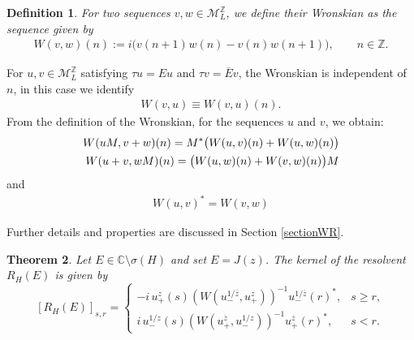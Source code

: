 \documentclass[12pt,oneside,onecolumn,open]{article}
\newtheorem{teo}{Theorem}[section]
\newtheorem{defi}[teo]{Definition}
\begin{document}
\begin{defi}\label{wronskidefi}
For two sequences $v, w \in \mathcal{M}_L^{\mathbb{Z}}$, we define their Wronskian as the sequence given by
\begin{align}
W(v, w)(n) := i\big( v(n+1)^{} w(n) - v(n)^{} w(n+1) \big), \qquad n \in \mathbb{Z}.
\end{align}
\end{defi}
For $u, v \in \mathcal{M}_{L}^{\mathbb{Z}}$ satisfying $\tau u = Eu$ and $\tau v = \overline{E}v$, the Wronskian is independent of $n$, in this case we identify
\begin{align}
W(v,u) \equiv W(v,u)(n).
\end{align}
      From the definition of the Wronskian, for the sequences $u$ and $v$, we obtain:
\begin{align}
    W(uM, v + w)(n) = M^{*} \big( W(u, v)(n) + W(u, w)(n) \big) \\\notag
    W(u + v, w M)(n) = \big( W(u, w)(n) + W(v, w)(n) \big) M
\end{align}
and 
\begin{align}
    W(u,v)^{*}=W(v,w)
\end{align}
   
 Further details and properties are discussed in Section \ref{sectionWR}.

\begin{teo}\label{GreenIntro}
Let \(E \in \mathbb{C} \setminus \sigma(H)\) and set \(E = J(z)\). The kernel of the resolvent \(R_{H}(E)\) is given by
\begin{equation}
\label{eq:Greenintro}
[R_{H}(E)]_{s,r} =
 \begin{cases}
    -i\, u_{+}^{z}(s)\left(W(u_{-}^{1/\overline{z}}, u_{+}^{z})\right)^{-1} u_{-}^{1/\overline{z}}(r)^{*}, & s \geq r, \\[10pt]
    i\, u_{-}^{1/z}(s)\left(W(u_{+}^{\overline{z}}, u_{-}^{1/z})\right)^{-1} u_{+}^{\overline{z}}(r)^{*}, & s < r.
 \end{cases}
\end{equation}

\end{teo}
\end{document}
